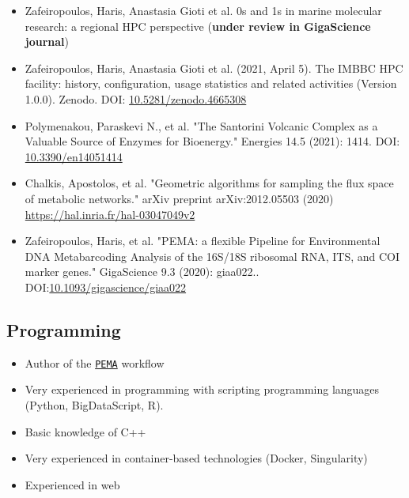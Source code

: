 \documentclass{article}
\begin{document}
\begin{itemize}

   \item Zafeiropoulos, Haris, Anastasia Gioti et al. 0s and 1s in marine molecular research: a regional HPC perspective (\textbf{under review in GigaScience journal})

   \item Zafeiropoulos, Haris, Anastasia Gioti et al. (2021, April 5). The IMBBC HPC facility: history, configuration, usage statistics and related activities (Version 1.0.0). Zenodo. DOI: \href{http://doi.org/10.5281/zenodo.4665308}{10.5281/zenodo.4665308}

   \item Polymenakou, Paraskevi N., et al. "The Santorini Volcanic Complex as a Valuable Source of Enzymes for Bioenergy." Energies 14.5 (2021): 1414. DOI: \href{https://doi.org/10.3390/en14051414}{10.3390/en14051414}
   
   \item Chalkis, Apostolos, et al. "Geometric algorithms for sampling the flux space of metabolic networks." arXiv preprint arXiv:2012.05503 (2020) \href{https://hal.inria.fr/hal-03047049v2}{https://hal.inria.fr/hal-03047049v2}
   
   \item Zafeiropoulos, Haris, et al. "PEMA: a flexible Pipeline for Environmental DNA Metabarcoding Analysis of the 16S/18S ribosomal RNA, ITS, and COI marker genes." GigaScience 9.3 (2020): giaa022.. 
   DOI:\href{https://doi.org/10.1093/gigascience/giaa022}{10.1093/gigascience/giaa022}
   
\end{itemize}


\subsection{Programming}

\begin{itemize}
   \item Author of the \href{https://github.com/hariszaf/pema}{\texttt{PEMA}} workflow
   \item Very experienced in programming with scripting programming languages \\
   (Python, BigDataScript, R).
   \item Basic knowledge of C++
   \item Very experienced in container-based technologies (Docker, Singularity)
   \item Experienced in web 
\end{itemize}
\end{document}
